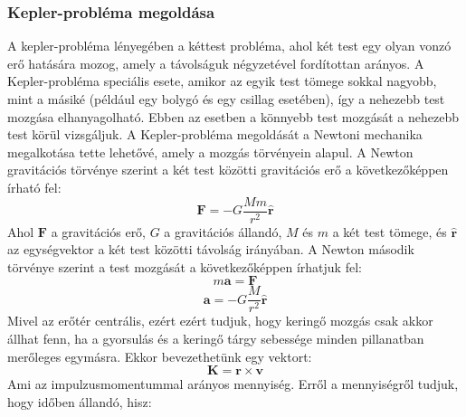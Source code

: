 \documentclass[a4paper,12pt]{article}
\begin{document}
\subsubsection{Kepler-probléma megoldása}
A kepler-probléma lényegében a kéttest probléma, ahol két test egy olyan vonzó erő hatására mozog, amely a távolságuk négyzetével fordítottan arányos. A Kepler-probléma speciális esete, amikor az egyik test tömege sokkal nagyobb, mint a másiké (például egy bolygó és egy csillag esetében),
így a nehezebb test mozgása elhanyagolható. Ebben az esetben a könnyebb test mozgását a nehezebb test körül vizsgáljuk. A Kepler-probléma megoldását a Newtoni mechanika megalkotása tette lehetővé, amely a mozgás törvényein alapul.
A Newton gravitációs törvénye szerint a két test közötti gravitációs erő a következőképpen írható fel:
\begin{equation}
    \mathbf{F} = -G \frac{M m}{r^2} \hat{\mathbf{r}}
\end{equation}
Ahol $\mathbf{F}$ a gravitációs erő, $G$ a gravitációs állandó, $M$ és $m$ a két test tömege, és $\hat{\mathbf{r}}$ az egységvektor a két test közötti távolság irányában. 
A Newton második törvénye szerint a test mozgását a következőképpen írhatjuk fel:
\begin{equation}
    m \mathbf{a} = \mathbf{F}
\end{equation}
\begin{equation}
    \mathbf{a} = -G \frac{M}{r^2} \hat{\mathbf{r}}
\end{equation}
Mivel az erőtér centrális, ezért ezért tudjuk, hogy keringő mozgás csak akkor állhat fenn, ha a gyorsulás és a keringő tárgy sebessége minden pillanatban merőleges egymásra. Ekkor bevezethetünk egy vektort:
\begin{equation}
    \mathbf{K} = \mathbf{r} \times \mathbf{v}
\end{equation}
Ami az impulzusmomentummal arányos mennyiség. Erről a mennyiségről tudjuk, hogy időben állandó, hisz:
\end{document}
